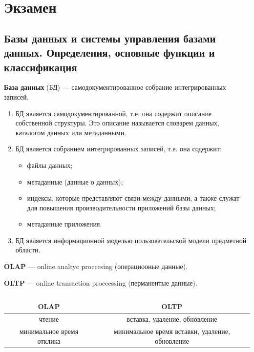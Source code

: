 \section{Экзамен}

\subsection{Базы данных и системы управления базами данных. Определения, основные функции и классификация}

\textbf{База данных} (БД) ---  самодокументированное собрание интегрированных записей.

\begin{enumerate}
	\item БД является самодокументированной, т.е. она содержит описание собственной структуры. Это описание называется словарем данных, каталогом данных или метаданными.
	\item БД является собранием интегрированных записей, т.е. она содержит:
	\begin{itemize}
		\item файлы данных;
		\item метаданные (данные о данных);
		\item индексы, которые представляют связи между данными, а также служат для повышения производительности приложений базы данных;
		\item метаданные приложения.
	\end{itemize}
	\item БД является информационной моделью пользовательской модели предметной области.
\end{enumerate}

\textbf{OLAP} --- online analtyc proccesing (операциооные данные).

\textbf{OLTP} --- online transaction proccessing (перманентые данные).

\begin{table}[ht!]
	\begin{center}
		\caption{}
		\label{tbl:best}
		\begin{tabular}{|c|c|}
			\hline
			OLAP & OLTP \\
			\hline
			чтение & вставка, удаление, обновление \\
			\hline
			минимальное время отклика & минимальное время вставки, удаление, обновление \\
			\hline
		\end{tabular}
	\end{center}
\end{table}

